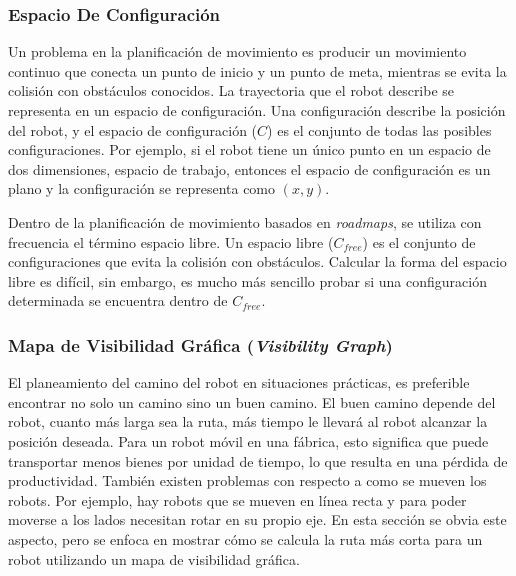 \subsubsection{Espacio De Configuraci\'on}

Un problema en la planificaci\'on de movimiento es producir un movimiento 
continuo que conecta un punto de inicio y un punto de meta, mientras se evita 
la colisi\'on con obst\'aculos conocidos. La trayectoria que el robot describe 
se representa en un espacio de configuraci\'on. Una configuraci\'on describe 
la posici\'on del robot, y el espacio de configuraci\'on ($C$) es el conjunto 
de todas las posibles configuraciones. Por ejemplo, si el robot tiene 
un \'unico punto en un espacio de dos dimensiones, espacio de trabajo, entonces 
el espacio de configuraci\'on es un plano y la configuraci\'on se representa 
como $(x,y)$.

Dentro de la planificaci\'on de movimiento basados en \textit{roadmaps}, se 
utiliza con frecuencia el t\'ermino espacio libre. Un espacio libre ($C_{free}$) 
es el conjunto de configuraciones que evita la colisi\'on con obst\'aculos. Calcular 
la forma del espacio libre es dif\'icil, sin embargo, es mucho m\'as sencillo 
probar si una configuraci\'on determinada se encuentra dentro de $C_{free}$. 

\subsubsection{Mapa de Visibilidad Gr\'afica (\textit{Visibility Graph})}

El planeamiento del camino del robot en situaciones pr\'acticas, es preferible 
encontrar no solo un camino sino un buen camino. El buen camino depende del 
robot, cuanto m\'as larga sea la ruta, m\'as tiempo le llevar\'a al robot 
alcanzar la posici\'on deseada. Para un robot m\'ovil en una f\'abrica, esto 
significa que puede transportar menos bienes por unidad de tiempo, lo que 
resulta en una p\'erdida de productividad. Tambi\'en existen problemas con 
respecto a como se mueven los robots. Por ejemplo, hay robots que se mueven 
en l\'inea recta y para poder moverse a los lados necesitan rotar en su 
propio eje. En esta secci\'on se obvia este aspecto, pero se enfoca en 
mostrar c\'omo se calcula la ruta m\'as corta para un robot utilizando 
un mapa de visibilidad gr\'afica.


